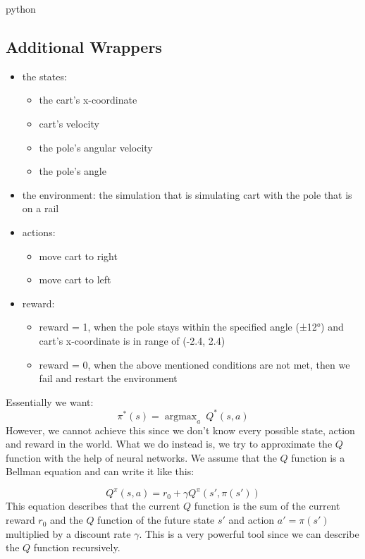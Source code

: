 \documentclass{article}
\numberwithin{equation}{section}
\DeclareMathOperator*{\argmax}{argmax} %
\numberwithin{equation}{section}
\begin{document}
\begin{enumarte}
\begin{mintedbox}{python}
\subsection*{Additional Wrappers}








\begin{itemize}
\item the states: 
\begin{itemize}
\item the cart's x-coordinate
\item cart's velocity
\item the pole's angular velocity
\item the pole's angle
\end{itemize}
\item the environment: the simulation that is simulating cart with the pole that is on a rail
\item actions:
\begin{itemize}
\item move cart to right
\item move cart to left
\end{itemize} 
\item reward:
\begin{itemize}
\item reward = 1, when the pole stays within the specified angle (±12°) and cart's x-coordinate is in range of (-2.4, 2.4)
\item reward = 0, when the above mentioned conditions are not met, then we fail and restart the environment
\end{itemize} 
\end{itemize}  

Essentially we want:
$$
\pi^*(s) = \argmax_a \ Q^*(s,a)
$$
However, we cannot achieve this since we don't know every possible state, action and reward in the world. What we do instead is, we try to approximate the $Q$ function with the help of neural networks. We assume that the $Q$ function is a Bellman equation and can write it like this:

$$
Q^{\pi}(s,a) = r_0 + \gamma Q^{\pi}(s',\pi(s'))
$$
This equation describes that the current $Q$ function is the sum of the current reward $r_0$ and the $Q$ function of the future state $s'$ and action $a' = \pi(s')$ multiplied by a discount rate $\gamma$. This is a very powerful tool since we can describe the $Q$ function recursively.


\end{mintedbox}
\end{enumarte}
\end{document}
